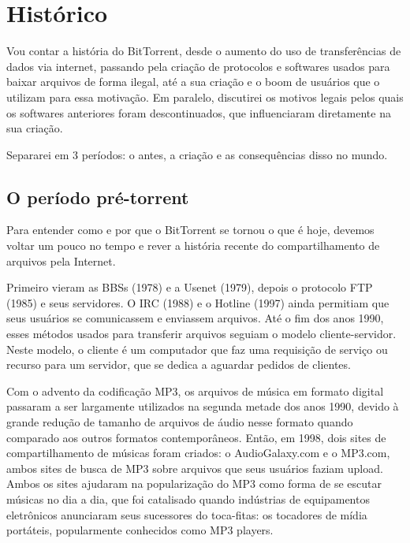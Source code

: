 
\section{Histórico}

Vou contar a história do BitTorrent, desde o aumento do uso de transferências de dados via internet, passando pela criação de protocolos e softwares usados para baixar arquivos de forma ilegal, até a sua criação e o boom de usuários que o utilizam para essa motivação. Em paralelo, discutirei os motivos legais pelos quais os softwares anteriores foram descontinuados, que influenciaram diretamente na sua criação.

Separarei em 3 períodos: o antes, a criação e as consequências disso no mundo.

\subsection{O período pré-torrent}

Para entender como e por que o BitTorrent se tornou o que é hoje, devemos voltar um pouco no tempo e rever a história recente do compartilhamento de arquivos pela Internet.

Primeiro vieram as BBSs (1978) e a Usenet (1979), depois o protocolo FTP (1985) e seus servidores. O IRC (1988) e o Hotline (1997) ainda permitiam que seus usuários se comunicassem e enviassem arquivos. Até o fim dos anos 1990, esses métodos usados para transferir arquivos seguiam o modelo cliente-servidor. Neste modelo, o cliente é um computador que faz uma requisição de serviço ou recurso para um servidor, que se dedica a aguardar pedidos de clientes.

Com o advento da codificação MP3, os arquivos de música em formato digital passaram a ser largamente utilizados na segunda metade dos anos 1990, devido à grande redução de tamanho de arquivos de áudio nesse formato quando comparado aos outros formatos contemporâneos. Então, em 1998, dois sites de compartilhamento de músicas foram criados: o AudioGalaxy.com e o MP3.com, ambos sites de busca de MP3 sobre arquivos que seus usuários faziam upload. Ambos os sites ajudaram na popularização do MP3 como forma de se escutar músicas no dia a dia, que foi catalisado quando indústrias de equipamentos eletrônicos anunciaram seus sucessores do toca-fitas: os tocadores de mídia portáteis, popularmente conhecidos como MP3 players.

